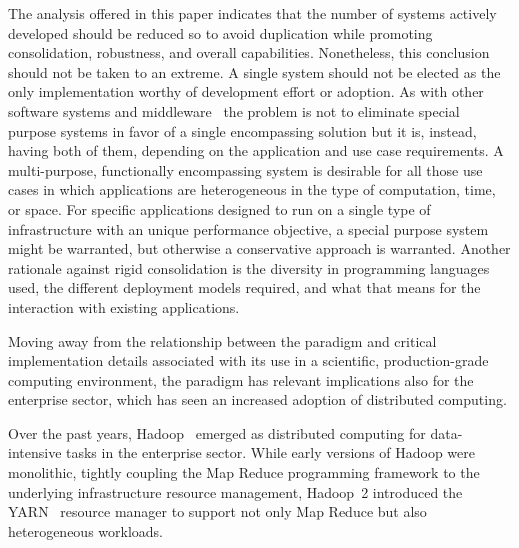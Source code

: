 \documentclass{sig-alternate}
\begin{document}
The analysis offered in this paper indicates that the number of \pilot systems
actively developed should be reduced so to avoid duplication while promoting
consolidation, robustness, and overall capabilities. Nonetheless, this
conclusion should not be taken to an extreme. A single \pilot system should not
be elected as the only implementation worthy of development effort or
adoption. As with other software systems and middleware~\cite{bernstein1996} the
problem is not to eliminate special purpose systems in favor of a single
encompassing solution but it is, instead, having both of them, depending on the
application and use case requirements. A multi-purpose, functionally
encompassing \pilot system is desirable for all those use cases in which
applications are heterogeneous in the type of computation, time, or space. For
specific applications designed to run on a single type of infrastructure with an
unique performance objective, a special purpose system might be warranted, but
otherwise a conservative approach is warranted.  Another rationale against rigid
consolidation is the diversity in programming languages used, the different
deployment models required, and what that means for the interaction with
existing applications.


 Moving away from the
relationship between the \pilot paradigm and critical implementation details
associated with its use in a scientific, production-grade computing environment,
the \pilot paradigm has relevant implications also for the enterprise sector,
which has seen an increased adoption of distributed computing.

Over the past years, Hadoop~\cite{hadoop_url} emerged as distributed computing
for data-intensive tasks in the enterprise sector. While early versions of
Hadoop were monolithic, tightly coupling the Map Reduce programming framework to
the underlying infrastructure resource management, Hadoop~2 introduced the
YARN~\cite{vavilapalli2013apache} resource manager to support not only Map Reduce but also
heterogeneous workloads.
\end{document}
